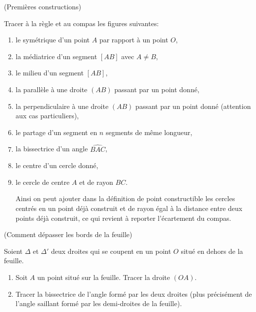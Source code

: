 \documentclass[a4paper,11pt,reqno]{amsart}
\begin{document}
\begin{exo} (Premières constructions)


  Tracer à la règle et au compas les figures suivantes:
  \begin{enumerate}
    \item le symétrique d'un point $A$ par rapport à un point $O$,
    \item la médiatrice d'un segment $[AB]$ avec $A \neq B$,
    \item le milieu d'un segment $[AB]$,
    \item la parallèle à une droite $(AB)$ passant par un point donné,
    \item la perpendiculaire à une droite $(AB)$ passant par un point donné (attention aux cas particuliers),
    \item le partage d'un segment en $n$ segments de même longueur,
    \item la bissectrice d'un angle $\widehat{BAC}$,
    \item le centre d'un cercle donné,
    \item le cercle de centre $A$ et de rayon $BC$.
    \begin{convention}
      Ainsi on peut ajouter dans la définition de point constructible les cercles centrés en un point déjà construit et de rayon égal à la distance entre deux points déjà construit, ce qui revient à reporter l'écartement du compas.
    \end{convention}
  \end{enumerate}
\end{exo}


\begin{exo}  (Comment dépasser les bords de la feuille)

  Soient $\Delta$ et $\Delta'$ deux droites qui se coupent en un point $O$ situé en dehors de la feuille.
  \begin{enumerate}
    \item Soit $A$ un point situé sur la feuille. Tracer la droite $(OA)$.
    \item Tracer la bissectrice de l'angle formé par les deux droites (plus précisément de l'angle saillant formé par les demi-droites de la feuille).
  \end{enumerate}

\end{exo}
\end{document}

